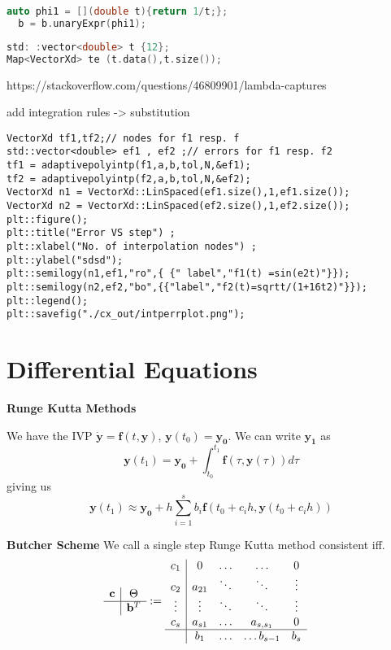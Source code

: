 \documentclass{sciposter}
\renewcommand{\vec}[1]{\mathbf{#1}}
\newcommand{\psection}[1]{\par \textbf{\large#1}}
\begin{document}
\begin{multicols}{2}
\begin{lstlisting}[language=c++]
  auto phi1 = [](double t){return 1/t;};
  b = b.unaryExpr(phi1);
\end{lstlisting}



\begin{lstlisting}[language=c++]
std: :vector<double> t {12};
Map<VectorXd> te (t.data(),t.size());
\end{lstlisting}



https://stackoverflow.com/questions/46809901/lambda-captures


add integration rules -> substitution


\begin{lstlisting}
VectorXd tf1,tf2;// nodes for f1 resp. f
std::vector<double> ef1 , ef2 ;// errors for f1 resp. f2
tf1 = adaptivepolyintp(f1,a,b,tol,N,&ef1);
tf2 = adaptivepolyintp(f2,a,b,tol,N,&ef2);
VectorXd n1 = VectorXd::LinSpaced(ef1.size(),1,ef1.size());
VectorXd n2 = VectorXd::LinSpaced(ef2.size(),1,ef2.size());
plt::figure();
plt::title("Error VS step") ;
plt::xlabel("No. of interpolation nodes") ;
plt::ylabel("sdsd");
plt::semilogy(n1,ef1,"ro",{ {" label","f1(t) =sin(e2t)"}});
plt::semilogy(n2,ef2,"bo",{{"label","f2(t)=sqrtt/(1+16t2)"}});
plt::legend();
plt::savefig("./cx_out/intperrplot.png");
\end{lstlisting}





\section{Differential Equations}


\psection{Runge Kutta Methods}

We have the IVP  $\dot{\vec{y}} = \vec{f}(t,\vec{y})$, $\vec{y}(t_0) = \vec{y_0}$. We can write $\vec{y_1}$ as $$\vec{y}(t_1) = \vec{y_0} + \int_{t_0}^{t_1} \vec{f}(\tau, \vec{y}(\tau)) d\tau $$
giving us
$$
\vec{y}(t_1) \approx \vec{y_0} + h\sum_{i=1}^{s} b_i \vec{f}(t_0 + c_i h , \vec{y}(t_0 + c_i h))
$$


\psection{Butcher Scheme}
We call a single step Runge Kutta method consistent iff. 
\begin{align*}
	\begin{array}
	{c|ccccc}
	\vec{c} &  \Theta \\
	\hline
	& \vec{b}^T
	\end{array} &:= 
	\begin{array}{c|cccc}
	c_1 &  0 & \ldots & \ldots & 0  \\
	c_2 &  a_{21} & \ddots &\ddots & \vdots\\
	\vdots & \vdots& \ddots & \ddots & \vdots \\
	c_s & a_{s1} & \ldots & a_{s,s_1} & 0\\
	\hline
	& b_1 &\ldots & \ldots b_{s-1} & b_s
	\end{array} 
\end{align*}



\end{multicols}
\end{document}
